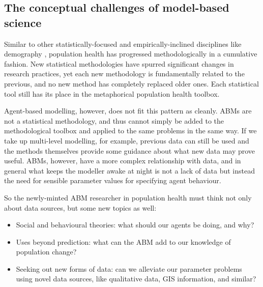 \documentclass[review]{elsarticle}
\begin{document}
\subsection{The conceptual challenges of model-based science}

Similar to other statistically-focused and empirically-inclined disciplines like demography \cite{courgeau2017}, population health has progressed methodologically in a cumulative fashion.  New statistical methodologies have spurred significant changes in research practices, yet each new methodology is fundamentally related to the previous, and no new method has completely replaced older ones.  Each statistical tool still has its place in the metaphorical population health toolbox.


Agent-based modelling, however, does not fit this pattern as cleanly. ABMs are not a statistical methodology, and thus cannot simply be added to the methodological toolbox and applied to the same problems in the same way.  If we take up multi-level modelling, for example, previous data can still be used and the methods themselves provide some guidance about what new data may prove useful. ABMs, however, have a more complex relationship with data, and in general what keeps the modeller awake at night is not a lack of data but instead the need for sensible parameter values for specifying agent behaviour.

So the newly-minted ABM researcher in population health must think not only about data sources, but some new topics as well:
\begin{itemize}
    \item Social and behavioural theories: what should our agents be doing, and why?
    \item Uses beyond prediction: what can the ABM add to our knowledge of population change?
    \item Seeking out new forms of data: can we alleviate our parameter problems using novel data sources, like qualitative data, GIS information, and similar?
\end{itemize}
\end{document}
